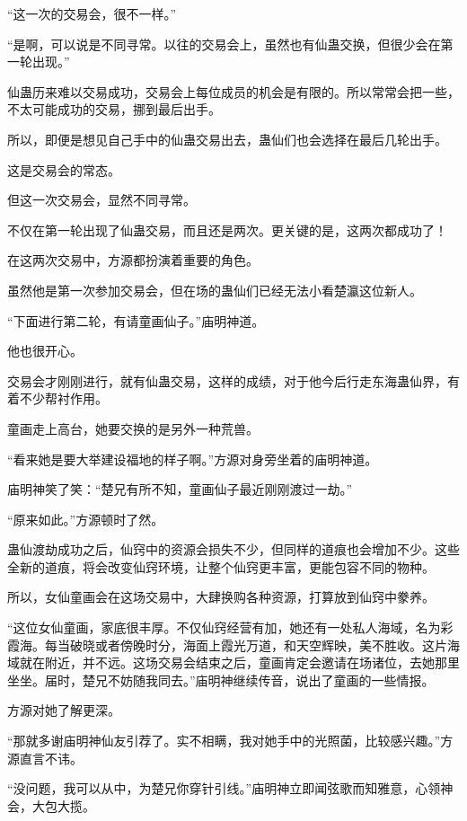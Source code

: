 
\begin{this_body}

“这一次的交易会，很不一样。”

“是啊，可以说是不同寻常。以往的交易会上，虽然也有仙蛊交换，但很少会在第一轮出现。”

仙蛊历来难以交易成功，交易会上每位成员的机会是有限的。所以常常会把一些，不太可能成功的交易，挪到最后出手。

所以，即便是想见自己手中的仙蛊交易出去，蛊仙们也会选择在最后几轮出手。

这是交易会的常态。

但这一次交易会，显然不同寻常。

不仅在第一轮出现了仙蛊交易，而且还是两次。更关键的是，这两次都成功了！

在这两次交易中，方源都扮演着重要的角色。

虽然他是第一次参加交易会，但在场的蛊仙们已经无法小看楚瀛这位新人。

“下面进行第二轮，有请童画仙子。”庙明神道。

他也很开心。

交易会才刚刚进行，就有仙蛊交易，这样的成绩，对于他今后行走东海蛊仙界，有着不少帮衬作用。

童画走上高台，她要交换的是另外一种荒兽。

“看来她是要大举建设福地的样子啊。”方源对身旁坐着的庙明神道。

庙明神笑了笑：“楚兄有所不知，童画仙子最近刚刚渡过一劫。”

“原来如此。”方源顿时了然。

蛊仙渡劫成功之后，仙窍中的资源会损失不少，但同样的道痕也会增加不少。这些全新的道痕，将会改变仙窍环境，让整个仙窍更丰富，更能包容不同的物种。

所以，女仙童画会在这场交易中，大肆换购各种资源，打算放到仙窍中豢养。

“这位女仙童画，家底很丰厚。不仅仙窍经营有加，她还有一处私人海域，名为彩霞海。每当破晓或者傍晚时分，海面上霞光万道，和天空辉映，美不胜收。这片海域就在附近，并不远。这场交易会结束之后，童画肯定会邀请在场诸位，去她那里坐坐。届时，楚兄不妨随我同去。”庙明神继续传音，说出了童画的一些情报。

方源对她了解更深。

“那就多谢庙明神仙友引荐了。实不相瞒，我对她手中的光照菌，比较感兴趣。”方源直言不讳。

“没问题，我可以从中，为楚兄你穿针引线。”庙明神立即闻弦歌而知雅意，心领神会，大包大揽。


\end{this_body}
